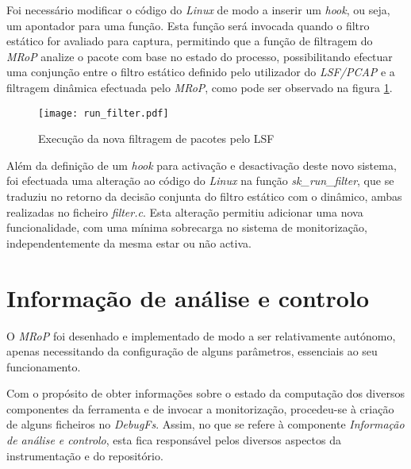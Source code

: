 Foi necessário modificar o código do \textit{Linux} de modo a inserir um \textit{hook}, ou seja, um apontador para uma função.
Esta função será invocada quando o filtro estático for avaliado para captura, permitindo que a função de filtragem do \textit{MRoP} analize o pacote com base no estado do processo, possibilitando efectuar uma conjunção entre o filtro estático definido pelo utilizador do \textit{LSF/PCAP} e a filtragem dinâmica efectuada pelo \textit{MRoP}, como pode ser observado na figura \ref{fig:run_filter}.

\begin{figure}[!ht]
\centering
\texttt{[image: run\_filter.pdf]}
\caption{Execução da nova filtragem de pacotes pelo LSF}
\label{fig:run_filter}
\end{figure}

Além da definição de um \textit{hook} para activação e desactivação deste novo sistema, foi efectuada uma alteração ao código do \textit{Linux} na função \textit{sk\_run\_filter}, que se traduziu no retorno da decisão conjunta do filtro estático com o dinâmico, ambas realizadas no ficheiro \textit{filter.c}.
Esta alteração permitiu adicionar uma nova funcionalidade, com uma mínima sobrecarga no sistema de monitorização, independentemente da mesma estar ou não activa.



\section{Informação de análise e controlo}

O \textit{MRoP} foi desenhado e implementado de modo a ser relativamente autónomo, apenas necessitando da configuração de alguns parâmetros, essenciais ao seu funcionamento.

Com o propósito de obter informações sobre o estado da computação dos diversos componentes da ferramenta e de invocar a monitorização, procedeu-se à criação de alguns ficheiros no \textit{DebugFs}.
Assim, no que se refere à componente \textit{Informação de análise e controlo}, esta fica responsável pelos diversos aspectos da instrumentação e do repositório.

